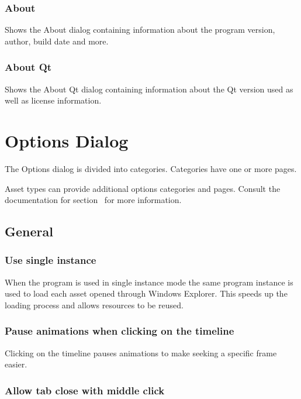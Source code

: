 \documentclass[10pt, a4paper, titlepage, oneside]{article}
\begin{document}
\subsubsection{About}

Shows the About dialog containing information about the program version, author, build date and more.

\subsubsection{About Qt}

Shows the About Qt dialog containing information about the Qt version used as well as license information.

\newpage

\section{Options Dialog}

The Options dialog is divided into categories. Categories have one or more pages.

Asset types can provide additional options categories and pages. Consult the documentation for section~ for more information.

\subsection{General}

\subsubsection{Use single instance}

When the program is used in single instance mode the same program instance is used to load each asset opened through Windows Explorer. This speeds up the loading process and allows resources to be reused.

\subsubsection{Pause animations when clicking on the timeline}

Clicking on the timeline pauses animations to make seeking a specific frame easier.

\subsubsection{Allow tab close with middle click}
\end{document}
